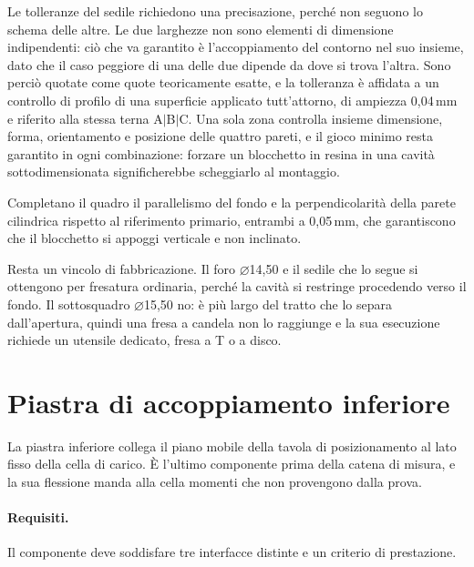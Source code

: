 Le tolleranze del sedile richiedono una precisazione, perché non seguono lo
schema delle altre. Le due larghezze non sono elementi di dimensione
indipendenti: ciò che va garantito è l'accoppiamento del contorno nel suo
insieme, dato che il caso peggiore di una delle due dipende da dove si trova
l'altra. Sono perciò quotate come quote teoricamente esatte, e la tolleranza è
affidata a un controllo di profilo di una superficie applicato tutt'attorno,
di ampiezza 0,04\,mm e riferito alla stessa terna A$\vert$B$\vert$C. Una sola
zona controlla insieme dimensione, forma, orientamento e posizione delle quattro
pareti, e il gioco minimo resta garantito in ogni combinazione: forzare un
blocchetto in resina in una cavità sottodimensionata significherebbe
scheggiarlo al montaggio.

Completano il quadro il parallelismo del fondo e la perpendicolarità della
parete cilindrica rispetto al riferimento primario, entrambi a 0,05\,mm, che
garantiscono che il blocchetto si appoggi verticale e non inclinato.

Resta un vincolo di fabbricazione. Il foro $\varnothing$14,50 e il sedile che lo
segue si ottengono per fresatura ordinaria, perché la cavità si restringe
procedendo verso il fondo. Il sottosquadro $\varnothing$15,50 no: è più largo
del tratto che lo separa dall'apertura, quindi una fresa a candela non lo
raggiunge e la sua esecuzione richiede un utensile dedicato, fresa a T o a
disco.


\section{Piastra di accoppiamento inferiore}
\label{sec:piastra-inferiore}

La piastra inferiore collega il piano mobile della tavola di posizionamento al
lato fisso della cella di carico. È l'ultimo componente prima della catena di
misura, e la sua flessione manda alla cella momenti che non provengono dalla
prova.

\paragraph{Requisiti.}
Il componente deve soddisfare tre interfacce distinte e un criterio di
prestazione.

